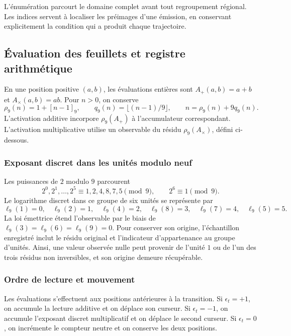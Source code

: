 L'énumération parcourt le domaine complet avant tout regroupement
régional. Les indices servent à localiser les préimages d'une
émission, en conservant explicitement la condition qui a produit chaque trajectoire.

\subsection{Évaluation des feuillets et registre arithmétique}
\label{tpk:lecturas}

En une position positive \((a,b)\), les évaluations entières sont
\(A_+(a,b)=a+b\) et \(A_\times(a,b)=ab\). Pour \(n>0\), on conserve
\begin{equation}
 \rho_9(n)=1+[n-1]_9,\qquad
 q_9(n)=\lfloor(n-1)/9\rfloor,\qquad
 n=\rho_9(n)+9q_9(n).
 \label{tpk:division-evaluacion}
\end{equation}
L'activation additive incorpore \(\rho_9(A_+)\) à l'accumulateur correspondant. L'activation multiplicative utilise un observable du résidu \(\rho_9(A_\times)\), défini ci-dessous.

\subsubsection{Exposant discret dans les unités modulo neuf}

Les puissances de \(2\) modulo \(9\) parcourent
\[
 2^0,2^1,\ldots,2^5\equiv1,2,4,8,7,5\pmod9,
 \qquad 2^6\equiv1\pmod9.
\]
Le logarithme discret dans ce groupe de six unités se représente par
\begin{equation}
 \ell_9(1)=0,\quad\ell_9(2)=1,\quad\ell_9(4)=2,
 \quad\ell_9(8)=3,\quad\ell_9(7)=4,\quad\ell_9(5)=5.
 \label{tpk:logaritmo}
\end{equation}
La loi émettrice étend l'observable par le biais de \(\ell_9(3)=\ell_9(6)=\ell_9(9)=0\). Pour conserver son origine, l'échantillon enregistré inclut le résidu original et l'indicateur d'appartenance au groupe d'unités. Ainsi, une valeur observée nulle peut provenir de l'unité \(1\) ou de l'un des trois résidus non inversibles, et son origine demeure récupérable.

\subsubsection{Ordre de lecture et mouvement}

Les évaluations s'effectuent aux positions antérieures à la transition.
Si \(\epsilon_t=+1\), on accumule la lecture additive et on déplace son curseur.
Si \(\epsilon_t=-1\), on accumule l'exposant discret multiplicatif et on
déplace le second curseur. Si \(\epsilon_t=0\), on incrémente le compteur
neutre et on conserve les deux positions.

